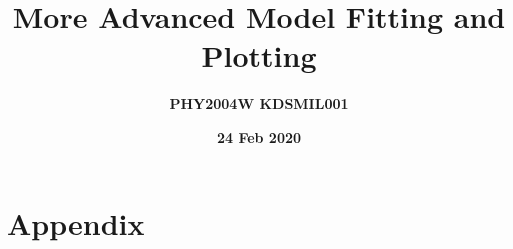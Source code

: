\documentclass[12pt]{article}
\title{More Advanced Model Fitting and Plotting}
\author{\textbf{PHY2004W \hspace{8cm} KDSMIL001}}
\date{\textbf{24 Feb 2020}}
\begin{document}
    \begin{titlepage}
        \maketitle
        \tableofcontents
    \end{titlepage}

    
    \section{Appendix}
    
    
    
    
\end{document}
